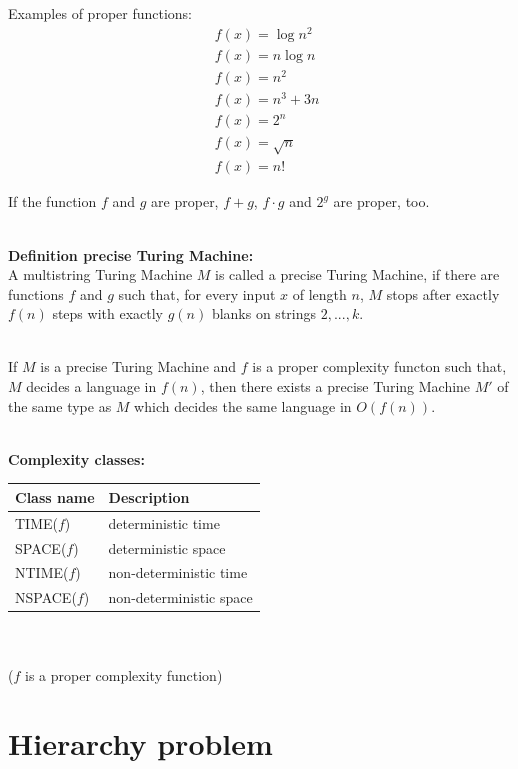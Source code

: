 \documentclass[a4]{scrartcl}
\begin{document}
Examples of proper functions: \cite{book} 
\begin{align*}
\ & f(x) = \log n^2 \\
\ & f(x) = n \log n \\
\ & f(x) = n^2 \\
\ & f(x) = n^3 +3n \\
\ & f(x) = 2^n \\
\ & f(x) = \sqrt{n} \\
\ & f(x) = n!
\end{align*}

If the function $f$ and $g$ are proper, $f+g$, $f \cdot g$ and $2^g$ are proper, too.

\ \\
\textbf{Definition precise Turing Machine:} \cite{book, CC} \\
A multistring Turing Machine $M$ is called a precise Turing Machine, if there are functions $f$ and $g$ such that, for every input $x$ of length $n$, $M$ stops after exactly $f(n)$ steps with exactly $g(n)$ blanks on strings $2, . . . , k$.

\ \\
If $M$ is a precise Turing Machine and $f$ is a proper complexity functon such that, $M$ decides a language in $f(n)$, then there exists a precise Turing Machine $M'$ of the same type as $M$ which decides the same language in $O(f(n))$.


\ \\
\textbf{Complexity classes:} \cite{book, CC} \\

\begin{tabular}{l|l}
Class name & Description \\
\hline
TIME($f$) & deterministic time \\
SPACE($f$) & deterministic space \\
NTIME($f$) & non-deterministic time \\
NSPACE($f$) & non-deterministic space \\
\end{tabular}
\ \\ \\
($f$ is a proper complexity function) 











\section*{Hierarchy problem}



\newpage

\printbibliography
\end{document}
